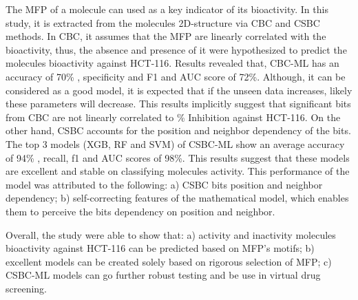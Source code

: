 The MFP of a molecule can used as a key indicator of its bioactivity. In this study, it is extracted from the molecules 2D-structure via CBC and CSBC methods. In CBC, it assumes that the MFP are linearly correlated with the bioactivity, thus, the absence and presence of it were hypothesized to predict the molecules bioactivity against HCT-116. Results revealed that, CBC-ML has an accuracy of 70\% , specificity and F1 and AUC score of 72\%. Although, it can be considered as a good model, it is expected that if the unseen data increases, likely these parameters will decrease. This results implicitly suggest that significant bits from CBC are not linearly correlated to \% Inhibition against HCT-116. On the other hand, CSBC accounts for the position and neighbor dependency of the bits. The top 3 models (XGB, RF and SVM) of CSBC-ML show an average accuracy of 94\% , recall, f1 and AUC scores of 98\%. This results suggest that these models are excellent and stable on classifying molecules activity. This performance of the model was attributed to the following: a) CSBC bits position and neighbor dependency; b) self-correcting features of the mathematical model, which enables them to perceive the bits dependency on position and neighbor.  

Overall, the study were able to show that: a) activity and inactivity molecules bioactivity against HCT-116 can be predicted based on MFP's motifs; b) excellent models can be created solely based on rigorous selection of MFP; c) CSBC-ML models can go  further robust testing and be use in virtual drug screening. 

